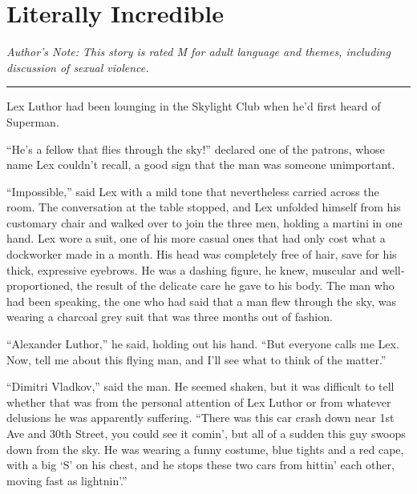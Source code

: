 \documentclass[ebook,12pt]{memoir}
\begin{document}
\tableofcontents*  %

\mainmatter         %





\hypertarget{literally-incredible}{%
\chapter{Literally Incredible}\label{literally-incredible}}

\emph{Author's Note: This story is rated M for adult language and
themes, including discussion of sexual violence.}

\begin{center}\rule{0.5\linewidth}{0.5pt}\end{center}

Lex Luthor had been lounging in the Skylight Club when he'd first heard
of Superman.

``He's a fellow that flies through the sky!'' declared one of the
patrons, whose name Lex couldn't recall, a good sign that the man was
someone unimportant.

``Impossible,'' said Lex with a mild tone that nevertheless carried
across the room. The conversation at the table stopped, and Lex unfolded
himself from his customary chair and walked over to join the three men,
holding a martini in one hand. Lex wore a suit, one of his more casual
ones that had only cost what a dockworker made in a month. His head was
completely free of hair, save for his thick, expressive eyebrows. He was
a dashing figure, he knew, muscular and well‐proportioned, the result of
the delicate care he gave to his body. The man who had been speaking,
the one who had said that a man flew through the sky, was wearing a
charcoal grey suit that was three months out of fashion.

``Alexander Luthor,'' he said, holding out his hand. ``But everyone
calls me Lex. Now, tell me about this flying man, and I'll see what to
think of the matter.''

``Dimitri Vladkov,'' said the man. He seemed shaken, but it was
difficult to tell whether that was from the personal attention of Lex
Luthor or from whatever delusions he was apparently suffering. ``There
was this car crash down near 1st Ave and 30th Street, you could see it
comin', but all of a sudden this guy swoops down from the sky. He was
wearing a funny costume, blue tights and a red cape, with a big `S' on
his chest, and he stops these two cars from hittin' each other, moving
fast as lightnin'.''
\end{document}
